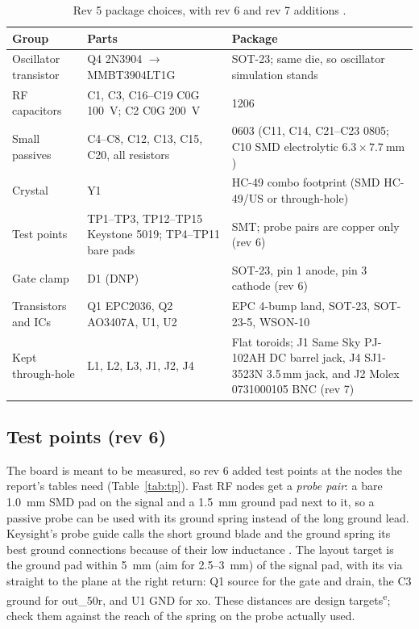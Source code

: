 \documentclass[11pt,letterpaper]{article}
\newcommand{\est}{\textsuperscript{e}}
\begin{document}
\begin{table}[h]
\centering\small
\caption{Rev 5 package choices, with rev 6 and rev 7 additions \cite{projkicad,projnotes}.}\label{tab:smt}
\begin{tabularx}{\textwidth}{@{}L{3.4cm}L{5.2cm}Y@{}}
\toprule
Group & Parts & Package \\ \midrule
Oscillator transistor & Q4 2N3904 $\to$ MMBT3904LT1G & SOT-23; same die, so oscillator simulation stands \cite{onsemiMMBT3904} \\
RF capacitors & C1, C3, C16--C19 C0G \SI{100}{\volt}; C2 C0G \SI{200}{\volt} & 1206 \\
Small passives & C4--C8, C12, C13, C15, C20, all resistors & 0603 (C11, C14, C21--C23 0805; C10 SMD electrolytic $6.3\times\SI{7.7}{\milli\meter}$) \\
Crystal & Y1 & HC-49 combo footprint (SMD HC-49/US or through-hole) \\
Test points & TP1--TP3, TP12--TP15 Keystone 5019; TP4--TP11 bare pads & SMT; probe pairs are copper only (rev 6) \\
Gate clamp & D1 (DNP) & SOT-23, pin 1 anode, pin 3 cathode (rev 6) \\
Transistors and ICs & Q1 EPC2036, Q2 AO3407A, U1, U2 & EPC 4-bump land, SOT-23, SOT-23-5, WSON-10 \\
Kept through-hole & L1, L2, L3, J1, J2, J4 & Flat toroids; J1 Same Sky PJ-102AH DC barrel jack, J4 SJ1-3523N 3.5\,mm jack, and J2 Molex 0731000105 BNC (rev 7) \cite{sameskyPJ102AH,sameskySJ1,molex73100} \\
\bottomrule
\end{tabularx}
\end{table}

\subsection{Test points (rev 6)}\label{sec:tp}
The board is meant to be measured, so rev 6 added test points at the nodes the report's tables need (Table~\ref{tab:tp}). Fast RF nodes get a \emph{probe pair}: a bare \SI{1.0}{\milli\meter} SMD pad on the signal and a \SI{1.5}{\milli\meter} ground pad next to it, so a passive probe can be used with its ground spring instead of the long ground lead. Keysight's probe guide calls the short ground blade and the ground spring its best ground connections because of their low inductance \cite{keysightN2870}. The layout target is the ground pad within \SI{5}{\milli\meter} (aim for 2.5--\SI{3}{\milli\meter}) of the signal pad, with its via straight to the plane at the right return: Q1 source for the gate and drain, the C3 ground for out\_50r, and U1 GND for xo. These distances are design targets\est; check them against the reach of the spring on the probe actually used.
\end{document}
